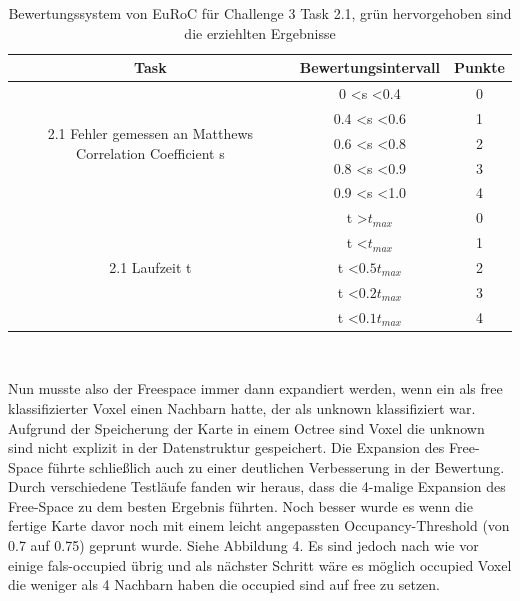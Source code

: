 \documentclass[12pt,titlepage, a4paper]{article}
\begin{document}
\begin{table}
\centering
\begin{tabular}{c|c|c}
Task & Bewertungsintervall & Punkte\\
\hline
\multirow{5}{210pt}{2.1 Fehler gemessen an Matthews Correlation Coefficient s} & 0 \textless s \textless 0.4 & 0 \\
 & 0.4 \textless  s \textless 0.6 & 1\\  
  & 0.6 \textless  s \textless 0.8 & 2\\
 & \cellcolor{green!10.0}0.8 \textless  s \textless 0.9 &\cellcolor{green!10.0} 3\\
 & 0.9 \textless  s \textless 1.0 & 4\\
\hline
\multirow{5}{210pt}{2.1 Laufzeit t} & t \textgreater $t_{max}$ & 0 \\
 & t \textless $t_{max}$ & 1\\  
  &\cellcolor{green!10.0} t \textless $0.5 t_{max}$ &\cellcolor{green!10.0} 2\\
  & t \textless $0.2 t_{max}$ & 3\\
 & t \textless $0.1 t_{max}$ & 4\\
\hline
\end{tabular}\\
\vspace{10mm}
\caption{Bewertungssystem von EuRoC für Challenge 3 Task 2.1, grün hervorgehoben sind die erziehlten Ergebnisse}
\label{table:scoringt2}
\end{table}

Nun musste also der Freespace immer dann expandiert werden, wenn ein als free klassifizierter Voxel einen Nachbarn hatte, der als unknown klassifiziert war. Aufgrund der Speicherung der Karte in einem Octree sind Voxel die unknown sind nicht explizit in der Datenstruktur gespeichert. Die Expansion des Free-Space führte schließlich auch zu einer deutlichen Verbesserung in der Bewertung. Durch verschiedene Testläufe fanden wir heraus, dass die 4-malige Expansion des Free-Space zu dem besten Ergebnis führten. Noch besser wurde es wenn die fertige Karte davor noch mit einem leicht angepassten Occupancy-Threshold (von 0.7 auf 0.75) geprunt wurde. Siehe Abbildung 4. Es sind jedoch nach wie vor einige fals-occupied übrig und als nächster Schritt wäre es möglich occupied Voxel die weniger als 4 Nachbarn haben die occupied sind auf free zu setzen.
\end{document}
